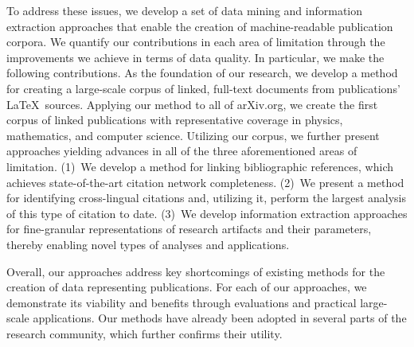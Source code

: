 To address these issues, we develop a set of data mining and information extraction approaches that enable the creation of machine-readable publication corpora.
We quantify our contributions in each area of limitation through the improvements we achieve in terms of data quality.
%
In particular, we make the following contributions.
As the foundation of our research, we develop a method for creating a large-scale corpus of linked, full-text documents from publications' \LaTeX\ sources. Applying our method to all of arXiv.org, we create the first corpus of linked publications with representative coverage in physics, mathematics, and computer science.
Utilizing our corpus, we further present approaches yielding advances in all of the three aforementioned areas of limitation.
(1)~We develop a method for linking bibliographic references, which achieves state-of-the-art citation network completeness. %
(2)~We present a method for identifying cross-lingual citations and, utilizing it, perform the largest analysis of this type of citation to date. %
(3)~We develop information extraction approaches for fine-granular representations of research artifacts and their parameters, thereby enabling novel types of analyses and applications. %


Overall, our approaches address key shortcomings of existing methods for the creation of data representing publications.
For each of our approaches, we demonstrate its viability and benefits through evaluations and practical large-scale applications.
Our methods have already been adopted in several parts of the research community, which further confirms their utility.
